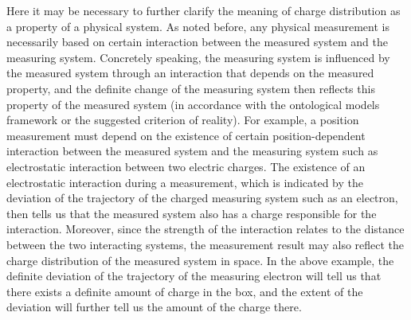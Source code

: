Here it may be necessary to further clarify the meaning of charge distribution as a property of a physical system. As noted before, any physical measurement is necessarily based on certain interaction between the measured system and the measuring system.  Concretely speaking, the measuring system is influenced by the measured system through an interaction that depends on the measured property, and the definite change of the measuring system then reflects this property of the measured system (in accordance with the ontological models framework or the suggested criterion of reality). 
For example, a position measurement must depend on the existence of certain position-dependent interaction between the measured system and the measuring system such as electrostatic interaction between two electric charges. The existence of an electrostatic interaction during a measurement, which is indicated by the deviation of the trajectory of the charged measuring system such as an electron, then tells us that the measured system also has a charge responsible for the interaction. Moreover, since the strength of the interaction relates to the distance between the two interacting systems, the measurement result may also reflect the charge distribution of the measured system in space. In the above example, the definite deviation of the trajectory of the measuring electron will tell us that there exists a definite amount of charge in the box, and the extent of the deviation will further tell us the amount of the charge there.

